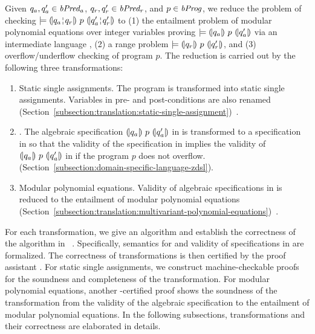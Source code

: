 
Given $q_a, q_a' \in \mathit{bPred_a}$, $q_r, q_r' \in \mathit{bPred_r}$, and $p \in \mathit{bProg}$, we reduce the problem of checking $\models \hoaretriple{q_a \andar q_r}{p}{q_a' \andar q_r'}$ to (1) the entailment problem of modular
polynomial equations over integer variables proving $\models {(\!|}{q_a}{|\!)}~{p}~{(\!|}{q_a'}{|\!)}$ via an intermediate language \zdsl, (2) a range problem $\models {(\!|}{q_r}{|\!)}~{p}~{(\!|}{q_r'}{|\!)}$, and (3) overflow/underflow checking of program $p$.
The reduction is carried out by the following three transformations:
\begin{enumerate}
\item Static single assignments. The program is transformed
  into static single assignments. Variables in pre- and
  post-conditions are also renamed
  (Section~\ref{subsection:translation:static-single-assignment})~\cite{AWZ:88:DQVP}.
\item \zdsl. The algebraic specification ${(\!|}{q_a}{|\!)}~{p}~{(\!|}{q_a'}{|\!)}$ in \bvdsl is transformed to a specification in \zdsl so that the validity of the specification in \zdsl implies the validity of ${(\!|}{q_a}{|\!)}~{p}~{(\!|}{q_a'}{|\!)}$ in \bvdsl if the program $p$ does not overflow. (Section~\ref{subsection:domain-specific-language-zdsl}).
\item Modular polynomial equations. Validity of algebraic specifications in \zdsl
  is reduced to the entailment of modular polynomial equations
  (Section~\ref{subsection:translation:multivariant-polynomial-equations})~\cite{H:07:AENTP}.
\end{enumerate}

For each transformation, we give an algorithm and establish the
correctness of the algorithm in \coq~\cite{YC:2004:ITPPDC}.
Specifically, semantics for \zdsl and validity of specifications in \zdsl are formalized.
The correctness of transformations is then certified by the proof assistant \coq.
For static single assignments, we
construct machine-checkable proofs for the soundness and completeness
of the transformation. For modular polynomial equations, another
\coq-certified proof shows the soundness of the transformation
from the validity of the algebraic specification to the entailment of
modular polynomial equations. In the following subsections,
transformations and their correctness are elaborated in details.
